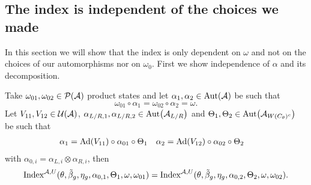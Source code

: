 \documentclass[11pt,a4paper,twoside]{article}
\numberwithin{equation}{section}
\begin{document}
\subsection{The index is independent of the choices we made}\label{sec:IndexIsInvariantUnderChoices}
In this section we will show that the index is only dependent on $\omega$ and not on the choices of our automorphisms nor on $\omega_0$. First we show independence of $\alpha$ and its decomposition.
\begin{lemma}
	Take $\omega_{01},\omega_{02}\in\PP(\AA)$ product states and let $\alpha_1,\alpha_2\in\Aut{\AA}$ be such that
	\begin{equation}
		\omega_{01}\circ\alpha_1=\omega_{02}\circ\alpha_2=\omega.
	\end{equation}
	Let $V_{11},V_{12}\in\UU(\AA)$, $\alpha_{L/R,1},\alpha_{L/R,2}\in\Aut{\AA_{L/R}}$ and $\Theta_1,\Theta_2\in \Aut{\AA_{W(C_\theta)^c}}$ be such that
	\begin{align}
		\alpha_1&=\Ad{V_{11}}\circ\alpha_{01}\circ\Theta_1&\alpha_2&=\Ad{V_{12}}\circ\alpha_{02}\circ \Theta_2
	\end{align}
	with $\alpha_{0,i}=\alpha_{L,i}\otimes\alpha_{R,i}$, then
	\begin{equation}
		\textrm{Index}^{\AA,U}(\theta,\tilde{\beta}_g,\eta_g,\alpha_{0,1},\Theta_1,\omega,\omega_{01})=\textrm{Index}^{\AA,U}(\theta,\tilde{\beta}_g,\eta_g,\alpha_{0,2},\Theta_2,\omega,\omega_{02}).
	\end{equation}
\end{lemma}
\end{document}
